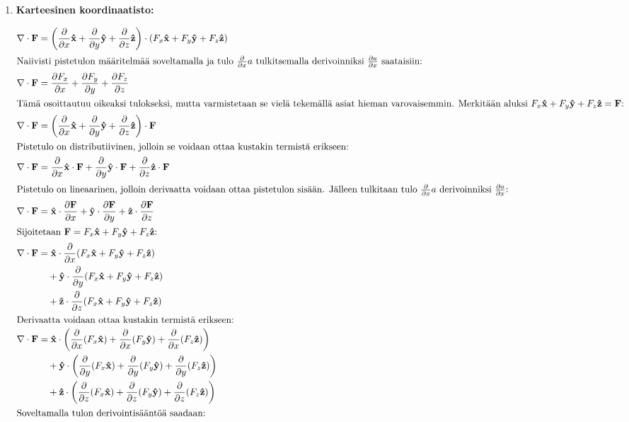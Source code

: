 \documentclass[../johdoksia.tex]{subfiles}
\begin{document}
	\begin{enumerate}
		\item \textbf{Karteesinen koordinaatisto:}
		
		\begin{align}
			\divop\vtr{F} &= \left(\pdv{}{x}\unitv{x} + \pdv{}{y}\unitv{y} + \pdv{}{z}\unitv{z}\right)\cdot(F_x\unitv{x} + F_y\unitv{y} + F_z\unitv{z}) \\
			\intertext{Naiivisti pistetulon määritelmää soveltamalla ja tulo $\pdv{}{x}a$ tulkitsemalla derivoinniksi $\pdv{a}{x}$ saataisiin:}
			\divop\vtr{F} &= \pdv{F_x}{x} + \pdv{F_y}{y} + \pdv{F_z}{z} \\
			\intertext{Tämä osoittautuu oikeaksi tulokseksi, mutta varmistetaan se vielä tekemällä asiat hieman varovaisemmin. Merkitään aluksi $F_x\unitv{x} + F_y\unitv{y} + F_z\unitv{z} = \vtr{F}$:}
			\divop\vtr{F} &= \left(\pdv{}{x}\unitv{x} + \pdv{}{y}\unitv{y} + \pdv{}{z}\unitv{z}\right)\cdot\vtr{F} \\
			\intertext{Pistetulo on distributiivinen, jolloin se voidaan ottaa kustakin termistä erikseen:}
			\divop\vtr{F} &= \pdv{}{x}\unitv{x}\cdot\vtr{F} + \pdv{}{y}\unitv{y}\cdot\vtr{F} + \pdv{}{z}\unitv{z}\cdot\vtr{F} \\
			\intertext{Pistetulo on lineaarinen, jolloin derivaatta voidaan ottaa pistetulon sisään. Jälleen tulkitaan tulo $\pdv{}{x}a$ derivoinniksi $\pdv{a}{x}$:}
			\divop\vtr{F} &= \unitv{x}\cdot\pdv{\vtr{F}}{x} + \unitv{y}\cdot\pdv{\vtr{F}}{y} + \unitv{z}\cdot\pdv{\vtr{F}}{z} \\
			\intertext{Sijoitetaan $\vtr{F} = F_x\unitv{x} + F_y\unitv{y} + F_z\unitv{z}$:}
			\divop\vtr{F} &= \unitv{x}\cdot\pdv{}{x}(F_x\unitv{x} + F_y\unitv{y} + F_z\unitv{z}) \\
			&\quad + \unitv{y}\cdot\pdv{}{y}(F_x\unitv{x} + F_y\unitv{y} + F_z\unitv{z}) \\
			&\quad + \unitv{z}\cdot\pdv{}{z}(F_x\unitv{x} + F_y\unitv{y} + F_z\unitv{z}) \\
			\intertext{Derivaatta voidaan ottaa kustakin termistä erikseen:}
			\divop\vtr{F} &= \unitv{x}\cdot\left(\pdv{}{x}(F_x\unitv{x}) + \pdv{}{x}(F_y\unitv{y}) + \pdv{}{x}(F_z\unitv{z})\right) \\
			&\quad + \unitv{y}\cdot\left(\pdv{}{y}(F_x\unitv{x}) + \pdv{}{y}(F_y\unitv{y}) + \pdv{}{y}(F_z\unitv{z})\right) \\
			&\quad + \unitv{z}\cdot\left(\pdv{}{z}(F_x\unitv{x}) + \pdv{}{z}(F_y\unitv{y}) + \pdv{}{z}(F_z\unitv{z})\right) \\
			\intertext{Soveltamalla tulon derivointisääntöä saadaan:}

\end{align}
\end{enumerate}
\end{document}
